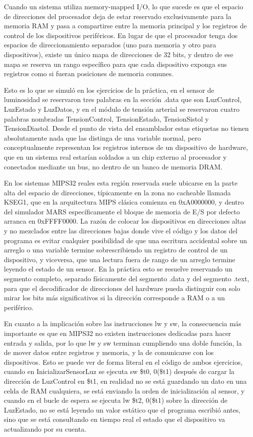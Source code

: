 \documentclass[12pt, letterpaper]{article}
\begin{document}
Cuando un sistema utiliza memory-mapped I/O, lo que sucede es que el espacio de direcciones del procesador deja de estar reservado exclusivamente para la memoria RAM y pasa a compartirse entre la memoria principal y los registros de control de los dispositivos periféricos. En lugar de que el procesador tenga dos espacios de direccionamiento separados (uno para memoria y otro para dispositivos), existe un único mapa de direcciones de 32 bits, y dentro de ese mapa se reserva un rango específico para que cada dispositivo exponga sus registros como si fueran posiciones de memoria comunes.

Esto es lo que se simuló en los ejercicios de la práctica, en el sensor de luminosidad se reservaron tres palabras en la sección .data que son LuzControl, LuzEstado y LuzDatos, y en el módulo de tensión arterial se reservaron cuatro palabras nombradas TensionControl, TensionEstado, TensionSistol y TensionDiastol. Desde el punto de vista del ensamblador estas etiquetas no tienen absolutamente nada que las distinga de una variable normal, pero conceptualmente representan los registros internos de un dispositivo de hardware, que en un sistema real estarían soldados a un chip externo al procesador y conectados mediante un bus, no dentro de un banco de memoria DRAM.

En los sistemas MIPS32 reales esta región reservada suele ubicarse en la parte alta del espacio de direcciones, típicamente en la zona no cacheable llamada KSEG1, que en la arquitectura MIPS clásica comienza en 0xA0000000, y dentro del simulador MARS específicamente el bloque de memoria de E/S por defecto arranca en 0xFFFF0000. La razón de colocar los dispositivos en direcciones altas y no mezclados entre las direcciones bajas donde vive el código y los datos del programa es evitar cualquier posibilidad de que una escritura accidental sobre un arreglo o una variable termine sobrescribiendo un registro de control de un dispositivo, y viceversa, que una lectura fuera de rango de un arreglo termine leyendo el estado de un sensor. En la práctica esto se resuelve reservando un segmento completo, separado físicamente del segmento .data y del segmento .text, para que el decodificador de direcciones del hardware pueda distinguir con solo mirar los bits más significativos si la dirección corresponde a RAM o a un periférico.

En cuanto a la implicación sobre las instrucciones lw y sw, la consecuencia más importante es que en MIPS32 no existen instrucciones dedicadas para hacer entrada y salida, por lo que lw y sw terminan cumpliendo una doble función, la de mover datos entre registros y memoria, y la de comunicarse con los dispositivos. Esto se puede ver de forma literal en el código de ambos ejercicios, cuando en InicializarSensorLuz se ejecuta sw \$t0, 0(\$t1) después de cargar la dirección de LuzControl en \$t1, en realidad no se está guardando un dato en una celda de RAM cualquiera, se está enviando la orden de inicialización al sensor, y cuando en el bucle de espera se ejecuta lw \$t2, 0(\$t1) sobre la dirección de LuzEstado, no se está leyendo un valor estático que el programa escribió antes, sino que se está consultando en tiempo real el estado que el dispositivo va actualizando por su cuenta.
\end{document}

